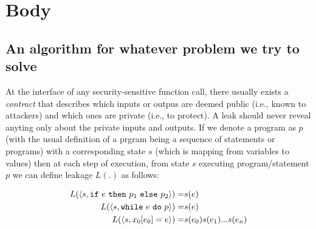 \section{Body}




\subsection{An algorithm for whatever problem we try to solve}

At the interface of any security-sensitive function call, there usually exists
a \emph{contract} that describes which inputs or outpus are deemed public
(i.e., known to attackers) and which ones are private (i.e., to protect).
A leak should never reveal anyting only about the private inputs and outputs.
If we denote a program as $p$ (with the usual definition of a prgram being a
sequence of statements or programs) with a corresponding state $s$ (which
is mapping from variables to values) then at each step of execution, from
state $s$ executing program/statement $p$ we can define leakage $L(.)$ as follows:

\begin{equation}
    \begin{split}
    L(\langle s, \text{\texttt{if}}~e~\text{\texttt{then}}~p_1~\text{\texttt{else}}~p_2 \rangle) = & s(e) \\
    L(\langle s, \text{\texttt{while}}~e~\text{\texttt{do}}~p \rangle) = & s(e) \\
    L(\langle s, x_0[e_0] = e \rangle) = & s(e_0)s(e_1)...s(e_n)
    \end{split}
\end{equation}

